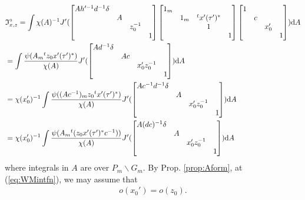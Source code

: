 \documentclass[11pt]{amsart}
\newcommand\If{\mathfrak{I}}
\newcommand\dr{\mathrm{d}}
\newcommand\1{\mathbf{1}}
\newcommand\bs{\backslash}%
\numberwithin{equation}{section}
\begin{document}
\begin{align}
& \If_{x,z}^\circ = \int \chi(A)^{-1} J'(\begin{bmatrix}
A  h'^{-1} d^{-1}\delta & & &  \\
& A&   & \\
& &z_{0}^{-1} &  \\
& & &1  \\
\end{bmatrix}
\begin{bmatrix}
1_m & & &  \\
& 1_m &{}^t x'(\tau')^* & \\
& & 1 &  \\
& & &1  \\
\end{bmatrix}
\begin{bmatrix}
1& & &  \\
& c & & \\
& &x_0' &  \\
& & & 1 \\
\end{bmatrix}) \dr A \notag \\
&= \int \frac{\psi(A_m {}^t z_0x'(\tau')^*)}{\chi(A)} J'(\begin{bmatrix}
A d^{-1}\delta & & &  \\
& A c &   & \\
& &x_0' z_{0}^{-1} &  \\
& & &1  \\
\end{bmatrix}) \dr A \notag \\
&= 
\chi(x_0')^{-1} \int \frac{\psi((Ac^{-1})_m z_0 {}^tx'(\tau')^*)}{\chi(A)} J'(\begin{bmatrix}
A c^{-1}d^{-1} \delta & & &  \\
& A &   & \\
& &x_0' z_{0}^{-1} &  \\
& & &1  \\
\end{bmatrix}) \dr A \notag \\
&= 
\chi(x_0')^{-1} \int \frac{\psi(A_m {}^t(z_0 x'(\tau')^*c^{-1}))}{\chi(A)}J'(\begin{bmatrix}
A (dc)^{-1}\delta & & &  \\
& A &   & \\
& &x_0' z_{0}^{-1} &  \\
& & &1  \\
\end{bmatrix}) \dr A \label{eq:WMintfn}
\end{align} 
where integrals in $A$ are over $P_m \bs G_m$.
By Prop. \ref{prop:Aform}, at (\ref{eq:WMintfn}), we may assume that
\begin{align}
o(x_0') = o(z_{0}). \label{eq:zx0}
\end{align}
\end{document}
